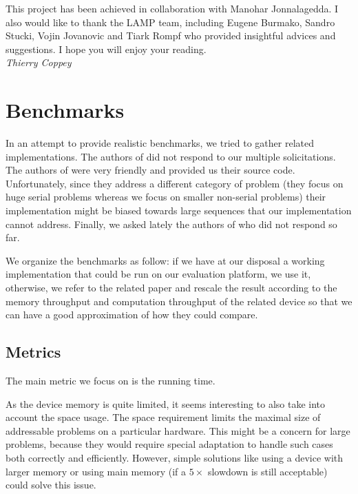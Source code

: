 \documentclass[11pt]{article}
\begin{document}
\vfill
This project has been achieved in collaboration with Manohar Jonnalagedda. I also would like to thank the LAMP team, including Eugene Burmako, Sandro Stucki, Vojin Jovanovic and Tiark Rompf who provided insightful advices and suggestions. I hope you will enjoy your reading. \vspace{.3cm}\\
\textit{Thierry Coppey}

\newpage
\setcounter{tocdepth}{2} \tableofcontents





\section{Benchmarks}
In an attempt to provide realistic benchmarks, we tried to gather related implementations. The authors of \cite{gpu_atlp} did not respond to our multiple solicitations. The authors of \cite{swat_mega} were very friendly and provided us their source code. Unfortunately, since they address a different category of problem (they focus on huge serial problems whereas we focus on smaller non-serial problems) their implementation might be biased towards large sequences that our implementation cannot address. Finally, we asked lately the authors of \cite{gpu_rnafold} {\color{red} who did not respond so far}.

We organize the benchmarks as follow: if we have at our disposal a working implementation that could be run on our evaluation platform, we use it, otherwise, we refer to the related paper and rescale the result according to the memory throughput and computation throughput of the related device so that we can have a good approximation of how they could compare.

\subsection{Metrics}
{\color{red} The main metric we focus on is the running time.}

As the device memory is quite limited, it seems interesting to also take into account the space usage. The space requirement limits the maximal size of addressable problems  on a particular hardware. This might be a concern for large problems, because they would require special adaptation to handle such cases both correctly and efficiently. However, simple solutions like using a device with larger memory or using main memory (if a $5\times$ slowdown is still acceptable) could solve this issue.
\end{document}
